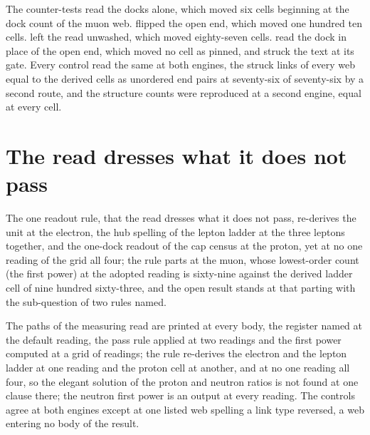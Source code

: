 \begin{chproof}[census]
The counter-tests read the docks alone, which moved six cells beginning at the dock count of the muon web. flipped the open end, which moved one hundred ten cells. left the read unwashed, which moved eighty-seven cells. read the dock in place of the open end, which moved no cell as pinned, and struck the text at its gate. Every control read the same at both engines, the struck links of every web equal to the derived cells as unordered end pairs at seventy-six of seventy-six by a second route, and the structure counts were reproduced at a second engine, equal at every cell.
\end{chproof}
\section{The read dresses what it does not pass}\label{mod:I-3-D535732-w-rdwp}
\begin{chwall}\label{box:I-3-D535732-w-rdwp:1}
The one readout rule, that the read dresses what it does not pass, re-derives the unit at the electron, the hub spelling of the lepton ladder at the three leptons together, and the one-dock readout of the cap census at the proton, yet at no one reading of the grid all four; the rule parts at the muon, whose lowest-order count (the first power) at the adopted reading is sixty-nine against the derived ladder cell of nine hundred sixty-three, and the open result stands at that parting with the sub-question of two rules named.
\end{chwall}
The paths of the measuring read are printed at every body, the register named at the default reading, the pass rule applied at two readings and the first power computed at a grid of readings; the rule re-derives the electron and the lepton ladder at one reading and the proton cell at another, and at no one reading all four, so the elegant solution of the proton and neutron ratios is not found at one clause there; the neutron first power is an output at every reading. The controls agree at both engines except at one listed web spelling a link type reversed, a web entering no body of the result.


